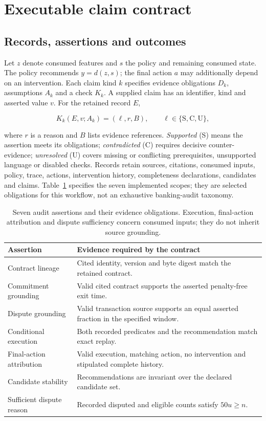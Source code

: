\documentclass[sigconf,nonacm]{acmart}
\begin{document}
\section{Executable claim contract}

\subsection{Records, assertions and outcomes}

Let \(z\) denote consumed features and \(s\) the policy and remaining consumed state. The policy recommends \(y=d(z,s)\); the final action \(a\) may additionally depend on an intervention. Each claim kind \(k\) specifies evidence obligations \(D_k\), assumptions \(A_k\) and a check \(K_k\). A supplied claim has an identifier, kind and asserted value \(v\). For the retained record \(E\),

\begin{equation}
K_k(E,v;A_k)=(\ell,r,B),\qquad
\ell\in\{\mathrm{S},\mathrm{C},\mathrm{U}\},
\end{equation}

where \(r\) is a reason and \(B\) lists evidence references. \emph{Supported} (S) means the assertion meets its obligations; \emph{contradicted} (C) requires decisive counter-evidence; \emph{unresolved} (U) covers missing or conflicting prerequisites, unsupported language or disabled checks. Records retain sources, citations, consumed inputs, policy, trace, actions, intervention history, completeness declarations, candidates and claims. Table~\ref{tab:claims} specifies the seven implemented scopes; they are selected obligations for this workflow, not an exhaustive banking-audit taxonomy.

\begin{table}[t]
\caption{Seven audit assertions and their evidence obligations. Execution, final-action attribution and dispute sufficiency concern consumed inputs; they do not inherit source grounding.}
\label{tab:claims}
\small
\begin{tabularx}{\columnwidth}{@{}lX@{}}
\toprule
Assertion & Evidence required by the contract \\
\midrule
Contract lineage & Cited identity, version and byte digest match the retained contract. \\
Commitment grounding & Valid cited contract supports the asserted penalty-free exit time. \\
Dispute grounding & Valid transaction source supports an equal asserted fraction in the specified window. \\
Conditional execution & Both recorded predicates and the recommendation match exact replay. \\
Final-action attribution & Valid execution, matching action, no intervention and stipulated complete history. \\
Candidate stability & Recommendations are invariant over the declared candidate set. \\
Sufficient dispute reason & Recorded disputed and eligible counts satisfy $50u\geq n$. \\
\bottomrule
\end{tabularx}
\end{table}
\end{document}
